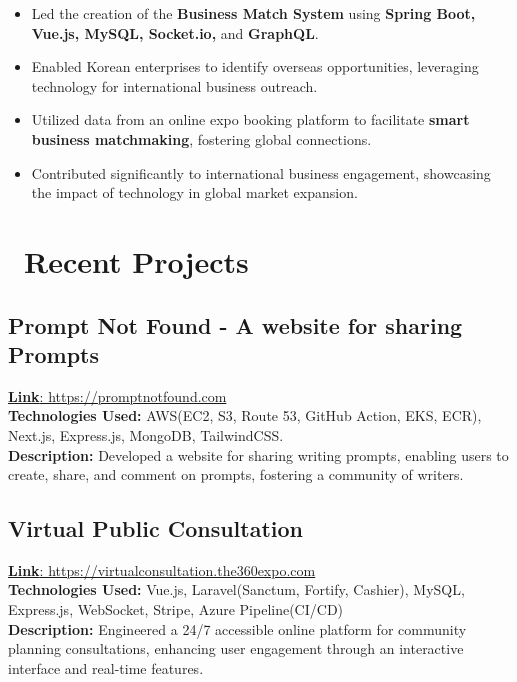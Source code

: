 \documentclass{resume}
\begin{document}
\begin{itemize}
  \item Led the creation of the \textbf{Business Match System} using \textbf{Spring Boot, Vue.js, MySQL, Socket.io,} and \textbf{GraphQL}.
  \item Enabled Korean enterprises to identify overseas opportunities, leveraging technology for international business outreach.
  \item Utilized data from an online expo booking platform to facilitate \textbf{smart business matchmaking}, fostering global connections.
  \item Contributed significantly to international business engagement, showcasing the impact of technology in global market expansion.
\end{itemize}


\section{\faServer\ Recent Projects}

\subsection*{\textbf{Prompt Not Found - A website for sharing Prompts}}
\href{https://promptnotfound.com}{\textbf{Link}: https://promptnotfound.com}  \\
\textbf{Technologies Used:} AWS(EC2, S3, Route 53, GitHub Action, EKS, ECR), Next.js, Express.js, MongoDB, TailwindCSS.  \\
\textbf{Description:} Developed a website for sharing writing prompts, enabling users to create, share, and comment on prompts, fostering a community of writers.

\subsection*{\textbf{Virtual Public Consultation}}
\href{https://virtualconsultation.the360expo.com}{\textbf{Link}: https://virtualconsultation.the360expo.com}  \\
\textbf{Technologies Used:} Vue.js, Laravel(Sanctum, Fortify, Cashier), MySQL, Express.js, WebSocket, Stripe, Azure Pipeline(CI/CD) \\
\textbf{Description:} Engineered a 24/7 accessible online platform for community planning consultations, enhancing user engagement through an interactive interface and real-time features.
\end{document}
